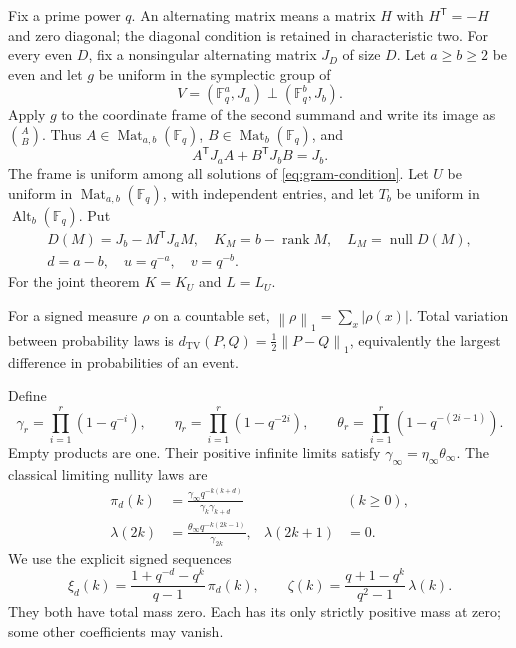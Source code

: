 \documentclass[11pt]{article}
\theoremstyle{definition}
\newcommand{\F}{\mathbb F_q}
\newcommand{\TV}{d_{\mathrm{TV}}}
\newcommand{\Mat}{\operatorname{Mat}}
\newcommand{\Alt}{\operatorname{Alt}}
\newcommand{\rank}{\operatorname{rank}}
\newcommand{\nul}{\operatorname{null}}
\newcommand{\normone}[1]{\left\|#1\right\|_1}
\newcommand{\trans}{\mathsf T}
\begin{document}
Fix a prime power \(q\). An alternating matrix means a matrix \(H\) with
\(H^{\trans}=-H\) and zero diagonal; the diagonal condition is retained in
characteristic two. For every even \(D\), fix a nonsingular alternating
matrix \(J_D\) of size \(D\). Let \(a\ge b\ge2\) be even and let \(g\) be
uniform in the symplectic group of
\[
 V=(\F^a,J_a)\perp(\F^b,J_b).
\]
Apply \(g\) to the coordinate frame of the second summand and write its
image as \(\binom A B\). Thus \(A\in\Mat_{a,b}(\F)\),
\(B\in\Mat_b(\F)\), and
\begin{equation}\label{eq:gram-condition}
 A^{\trans}J_aA+B^{\trans}J_bB=J_b.
\end{equation}
The frame is uniform among all solutions of \eqref{eq:gram-condition}.
Let \(U\) be uniform in \(\Mat_{a,b}(\F)\), with independent entries, and
let \(T_b\) be uniform in \(\Alt_b(\F)\). Put
\[
\begin{gathered}
 D(M)=J_b-M^{\trans}J_aM,\quad
 K_M=b-\rank M,\quad L_M=\nul D(M),\\
 d=a-b,\quad u=q^{-a},\quad v=q^{-b}.
\end{gathered}
\]
For the joint theorem \(K=K_U\) and \(L=L_U\).

For a signed measure \(\rho\) on a countable set,
\(\normone{\rho}=\sum_x|\rho(x)|\). Total variation between probability
laws is \(\TV(P,Q)=\tfrac12\normone{P-Q}\), equivalently the largest
difference in probabilities of an event.

Define
\begin{equation}\label{eq:products}
 \gamma_r=\prod_{i=1}^r(1-q^{-i}),\qquad
 \eta_r=\prod_{i=1}^r(1-q^{-2i}),\qquad
 \theta_r=\prod_{i=1}^r(1-q^{-(2i-1)}).
\end{equation}
Empty products are one. Their positive infinite limits satisfy
\(\gamma_\infty=\eta_\infty\theta_\infty\).
The classical limiting nullity laws are
\begin{align}
 \pi_d(k)&=\frac{\gamma_\infty q^{-k(k+d)}}{\gamma_k\gamma_{k+d}}
       &&(k\ge0),\label{eq:pi}\\
 \lambda(2k)&=\frac{\theta_\infty q^{-k(2k-1)}}{\gamma_{2k}},
 &\lambda(2k+1)&=0.\label{eq:lambda}
\end{align}
We use the explicit signed sequences
\begin{equation}\label{eq:signed}
 \xi_d(k)=\frac{1+q^{-d}-q^k}{q-1}\,\pi_d(k),
 \qquad
 \zeta(k)=\frac{q+1-q^k}{q^2-1}\,\lambda(k).
\end{equation}
They both have total mass zero. Each has its only strictly positive mass
at zero; some other coefficients may vanish.
\end{document}
